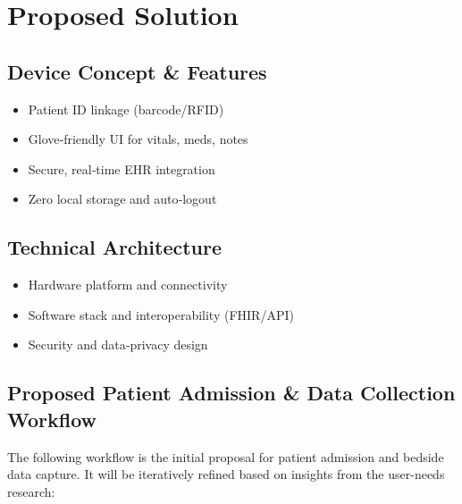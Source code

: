 \documentclass[a4paper,11pt]{article}
\begin{document}
\section{Proposed Solution}
\subsection{Device Concept \& Features}
\begin{itemize}
  \item Patient ID linkage (barcode/RFID)
  \item Glove‐friendly UI for vitals, meds, notes
  \item Secure, real‐time EHR integration
  \item Zero local storage and auto‐logout
\end{itemize}
\subsection{Technical Architecture}
\begin{itemize}
  \item Hardware platform and connectivity
  \item Software stack and interoperability (FHIR/API)
  \item Security and data‐privacy design
\end{itemize}

\subsection{Proposed Patient Admission \& Data Collection Workflow}

The following workflow is the initial proposal for patient admission and bedside data capture.  It will be iteratively refined based on insights from the user-needs research:
\end{document}
